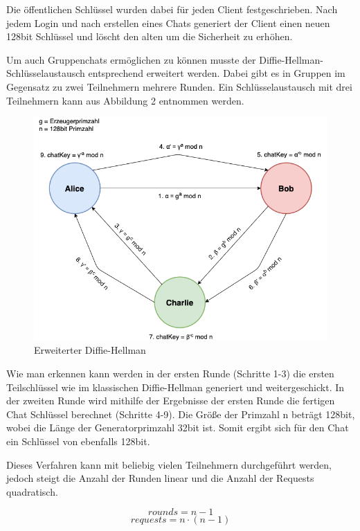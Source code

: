 Die öffentlichen Schlüssel wurden dabei für jeden Client festgeschrieben.
Nach jedem Login und nach erstellen eines Chats generiert der Client
einen neuen 128bit Schlüssel und löscht den alten um die Sicherheit
zu erhöhen.

Um auch Gruppenchats ermöglichen zu können musste der 
Diffie-Hellman-Schlüsselaustausch entsprechend erweitert werden.
Dabei gibt es in Gruppen im Gegensatz zu zwei Teilnehmern 
mehrere Runden. Ein Schlüsselaustausch mit drei Teilnehmern kann
aus Abbildung 2 entnommen werden.

\begin{figure}[h]
  \centering
  \includegraphics[width=\textwidth]{dh.png}
  
  \caption{Erweiterter Diffie-Hellman}
  \label{}
\end{figure}

Wie man erkennen kann werden in der ersten Runde (Schritte 1-3)
die ersten Teilschlüssel wie im klassischen Diffie-Hellman generiert
und weitergeschickt. In der zweiten Runde wird mithilfe der Ergebnisse
der ersten Runde die fertigen Chat Schlüssel berechnet (Schritte 4-9).
Die Größe der Primzahl n beträgt 128bit, wobei die Länge der
Generatorprimzahl 32bit ist. Somit ergibt sich für den Chat ein 
Schlüssel von ebenfalls 128bit.

\newpage

Dieses Verfahren kann mit beliebig vielen Teilnehmern durchgeführt
werden, jedoch steigt die Anzahl der Runden linear und die Anzahl der 
Requests quadratisch.

$$ rounds = n - 1 $$
$$ requests = n \cdot (n - 1) $$

